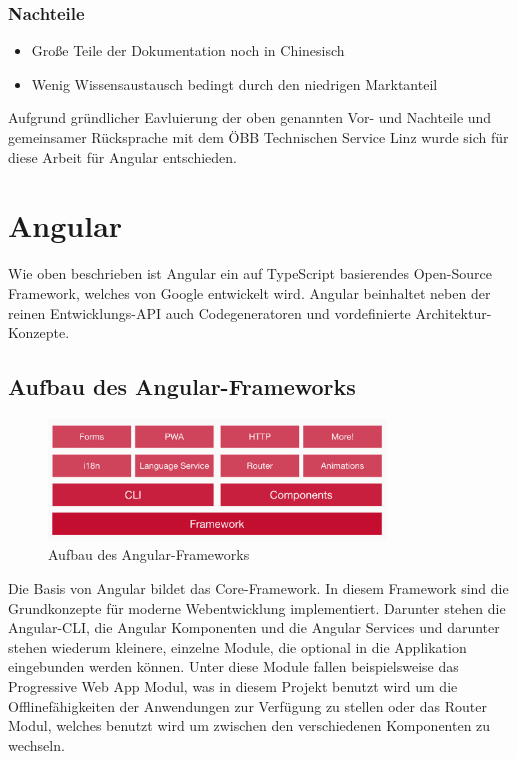 \subsubsection{Nachteile}
\begin{itemize}
    \item Große Teile der Dokumentation noch in Chinesisch
    \item Wenig Wissensaustausch bedingt durch den niedrigen Marktanteil
\end{itemize}

Aufgrund gründlicher Eavluierung der oben genannten Vor- und Nachteile und gemeinsamer Rücksprache mit dem ÖBB Technischen
Service Linz wurde sich für diese Arbeit für Angular entschieden.

\section{Angular}
Wie oben beschrieben ist Angular ein auf TypeScript basierendes Open-Source Framework, welches von Google entwickelt wird.
Angular beinhaltet neben der reinen Entwicklungs-API auch Codegeneratoren und vordefinierte Architektur-Konzepte.

\subsection{Aufbau des Angular-Frameworks}
\begin{figure}[h]
    \centering
    \includegraphics[width=0.80\textwidth]{pics/angular-platform-overview.png}
    \caption{Aufbau des Angular-Frameworks}
    \label{fig:aufbau_angular_framework}
\end{figure}

Die Basis von Angular bildet das Core-Framework. In diesem Framework sind die Grundkonzepte für moderne Webentwicklung 
implementiert. Darunter stehen die Angular-CLI, die Angular Komponenten und die Angular Services und darunter stehen wiederum 
kleinere, einzelne Module, die optional in die Applikation eingebunden werden können. Unter diese Module fallen beispielsweise
das Progressive Web App Modul, was in diesem Projekt benutzt wird um die Offlinefähigkeiten der Anwendungen zur Verfügung
zu stellen oder das Router Modul, welches benutzt wird um zwischen den verschiedenen Komponenten zu wechseln.

